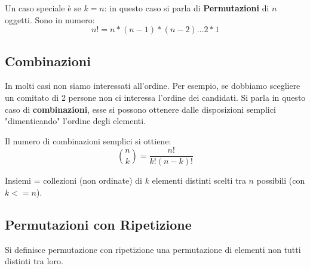 Un caso speciale è se $k = n$: in questo caso si parla di \textbf{Permutazioni} di $n$ oggetti. 
Sono in numero:
\begin{equation}
    n! = n*(n-1)*(n-2)\dots 2 * 1
\end{equation}


\subsection{Combinazioni}
In molti casi non siamo interessati all'ordine. 
Per esempio, se dobbiamo scegliere un comitato di 2 persone non ci interessa l'ordine 
dei candidati.
Si parla in questo caso di \textbf{combinazioni}, esse si possono ottenere dalle disposizioni semplici
"dimenticando" l'ordine degli elementi.

Il numero di combinazioni semplici si ottiene:
\[
    {n \choose k} = \frac{n!}{k!(n-k)!}
\]

Insiemi = collezioni (non ordinate) di $k$ elementi distinti scelti tra $n$ possibili (con $k <= n$).

\subsection{Permutazioni con Ripetizione}
Si definisce permutazione con ripetizione una permutazione di elementi non tutti distinti tra loro.

